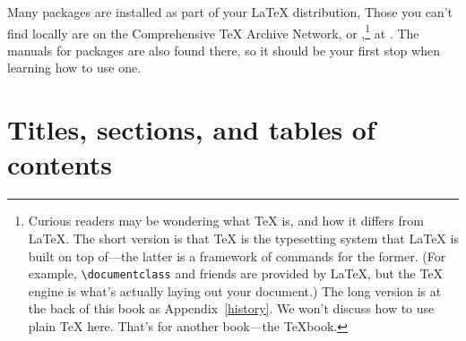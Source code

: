 Many packages are installed as part of your \LaTeX{} distribution,
Those you can't find locally are on the Comprehensive \TeX{}
Archive Network, or ,\punckern\footnote{Curious readers may
be wondering what \TeX{} is, and how it differs from \LaTeX.
The short version is that \TeX{} is the typesetting system that \LaTeX{}
is built on top of---the latter is a framework of commands for the former.
(For example, \texttt{\textbackslash documentclass} and friends are provided by
\LaTeX{}, but the \TeX{} engine is what's actually laying out your document.)
The long version is at the back of this book as Appendix~\ref{history}.
We won't discuss how to use plain \TeX{} here. That's for another book---the
\TeX book.}
at .
The manuals for packages are also found there,
so it should be your first stop when learning how to use one.

\section{Titles, sections, and tables of contents}

